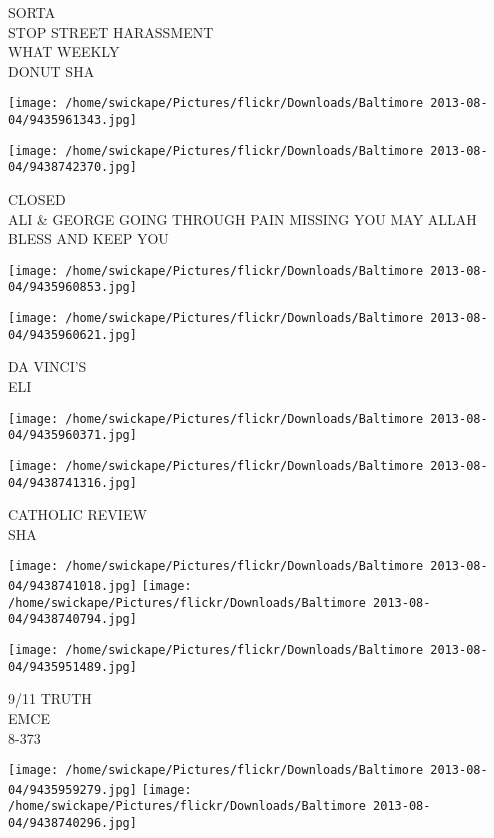 \documentclass[10pt,letterpaper]{article}
\begin{document}
SORTA\\
STOP STREET HARASSMENT\\
WHAT WEEKLY\\
DONUT SHA
\pagebreak

\texttt{[image: /home/swickape/Pictures/flickr/Downloads/Baltimore 2013-08-04/9435961343.jpg]}

\vspace{0.25in}
\texttt{[image: /home/swickape/Pictures/flickr/Downloads/Baltimore 2013-08-04/9438742370.jpg]}

CLOSED\\
ALI \& GEORGE GOING THROUGH PAIN MISSING YOU MAY ALLAH BLESS AND KEEP YOU
\pagebreak

\texttt{[image: /home/swickape/Pictures/flickr/Downloads/Baltimore 2013-08-04/9435960853.jpg]}

\vspace{0.25in}
\texttt{[image: /home/swickape/Pictures/flickr/Downloads/Baltimore 2013-08-04/9435960621.jpg]}

DA VINCI'S\\
ELI
\pagebreak

\texttt{[image: /home/swickape/Pictures/flickr/Downloads/Baltimore 2013-08-04/9435960371.jpg]}

\vspace{0.25in}
\texttt{[image: /home/swickape/Pictures/flickr/Downloads/Baltimore 2013-08-04/9438741316.jpg]}

CATHOLIC REVIEW\\
SHA
\pagebreak

\texttt{[image: /home/swickape/Pictures/flickr/Downloads/Baltimore 2013-08-04/9438741018.jpg]}
\texttt{[image: /home/swickape/Pictures/flickr/Downloads/Baltimore 2013-08-04/9438740794.jpg]}

\vspace{0.25in}
\texttt{[image: /home/swickape/Pictures/flickr/Downloads/Baltimore 2013-08-04/9435951489.jpg]}

9/11 TRUTH\\
EMCE\\
8{-}373
\pagebreak

\texttt{[image: /home/swickape/Pictures/flickr/Downloads/Baltimore 2013-08-04/9435959279.jpg]}
\texttt{[image: /home/swickape/Pictures/flickr/Downloads/Baltimore 2013-08-04/9438740296.jpg]}
\end{document}
